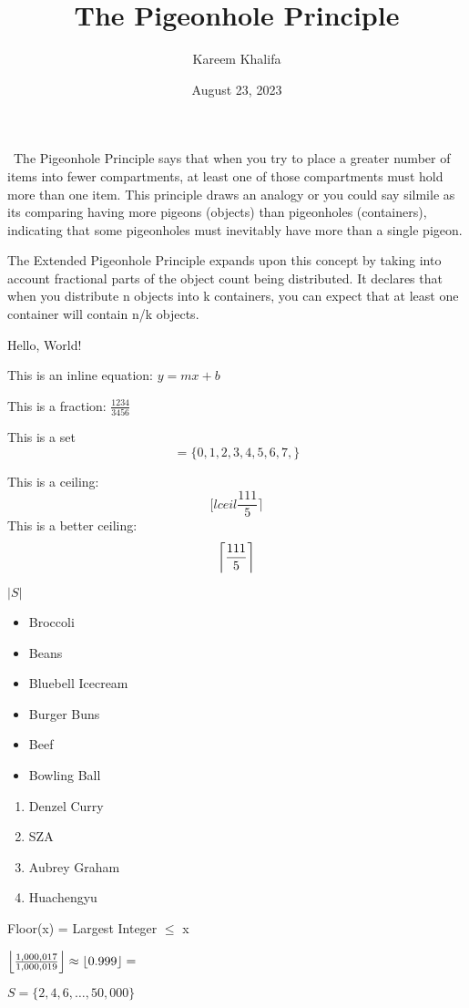 \documentclass{article}
\title{The Pigeonhole Principle}
\author{Kareem Khalifa}
\date{August 23, 2023}
\DeclarePairedDelimiter{\floor}{\lfloor}{\rfloor}
\DeclarePairedDelimiter{\ceiling}{\lceil}{\rceil}
\begin{document}
\maketitle
\
The Pigeonhole Principle says that when you try to place a greater number of items into fewer compartments, at least one of those compartments must hold more than one item. This principle draws an analogy or you could say silmile as its comparing having more pigeons (objects) than pigeonholes (containers), indicating that some pigeonholes must inevitably have more than a single pigeon.

The Extended Pigeonhole Principle expands upon this concept by taking into account fractional parts of the object count being distributed. It declares that when you distribute n objects into k containers, you can expect that at least one container will contain n/k objects.

Hello, World!

This is an inline equation: $y = mx + b$

This is a fraction: \( \frac{1234}{3456} \)

This is a set \[ = \{0, 1, 2, 3, 4, 5, 6, 7,\} \]

This is a ceiling: \[ [lceil \frac{111}{5} \rceil \]
\newpage
This is a better ceiling: \[ \ceiling*{\frac{111}{5}} \]

\( |S| \)

\begin{itemize}
\item Broccoli
\item Beans
\item Bluebell Icecream
\item Burger Buns
\item Beef
\item Bowling Ball

  \end{itemize}

\begin{enumerate}
\item {Denzel Curry}
\item {SZA}
\item {Aubrey Graham}
\item {Huachengyu}
\end{enumerate}

Floor(x) = Largest Integer $\le$ x

$ \floor*{\frac{1,000,017}{1,000,019}} \approx \floor{0.999} = $  



$S = \{2, 4, 6, \ldots, 50,000\} $
\end{document}
